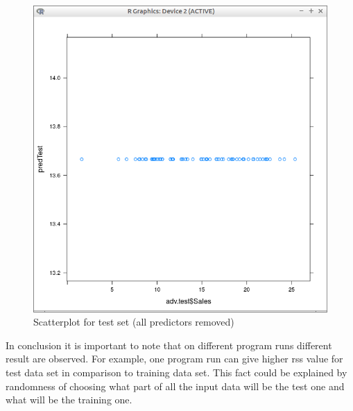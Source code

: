 \documentclass[10pt,a4paper]{article}
\begin{document}
\begin{figure}[H]
\centering
\includegraphics[width=140mm]{figures/pltIntTest.png}
\caption{Scatterplot for test set (all predictors removed) \label{overflow}}
\end{figure}

In conclusion it is important to note that on different program runs different result are observed. For example, one program run can give higher rss value for test data set in comparison to training data set. This fact could be explained by randomness of choosing what part of all the input data will be the test one and what will be the training one.\\

\vspace{5cm}
\end{document}
